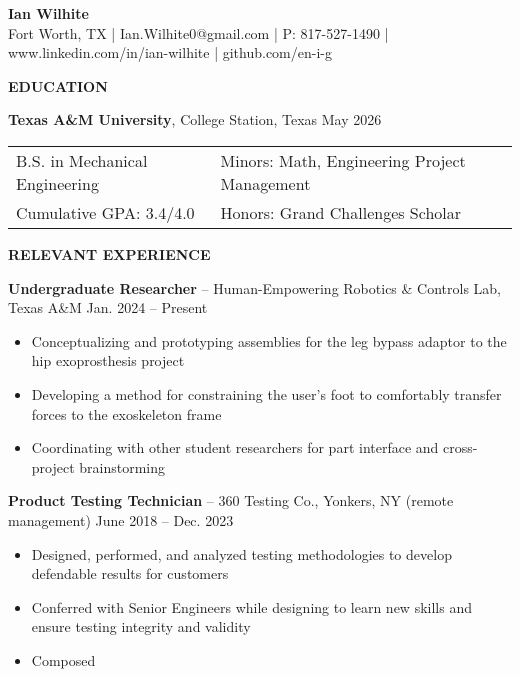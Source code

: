 \documentclass[18pt]{article}
\begin{document}
\begin{center}
    \LARGE \textbf{Ian Wilhite}\\ 
    \small Fort Worth, TX | Ian.Wilhite0@gmail.com | P: 817-527-1490 | www.linkedin.com/in/ian-wilhite | github.com/en-i-g
    
\end{center}

\begin{center}
    \textbf{EDUCATION}
    \hrulefill
\end{center}
\vspace{-0.5\baselineskip}
\textbf{Texas A\&M University}, College Station, Texas \hfill May 2026

\begin{tabular}{l|l} %
    B.S. in Mechanical Engineering \hspace*{1in} & Minors: Math, Engineering Project Management \\ 
    Cumulative GPA: 3.4/4.0 & Honors: Grand Challenges Scholar\\
\end{tabular}

\vspace{-0.5\baselineskip}
\begin{center}
    \textbf{RELEVANT EXPERIENCE}
    \hrulefill
\end{center}

\vspace{-0.5\baselineskip}
\textbf{Undergraduate Researcher} – Human-Empowering Robotics \& Controls Lab, Texas A\&M \hfill Jan. 2024 – Present

\begin{itemize}[noitemsep]
    \vspace{-0.75\baselineskip}
    \item Conceptualizing and prototyping assemblies for the leg bypass adaptor to the hip exoprosthesis project
    \item Developing a method for constraining the user’s foot to comfortably transfer forces to the exoskeleton frame
    \item Coordinating with other student researchers for part interface and cross-project brainstorming
\end{itemize}

\vspace{-0.5\baselineskip}
\textbf{Product Testing Technician} – 360 Testing Co., Yonkers, NY (remote management) \hfill June 2018 – Dec. 2023

\begin{itemize}[noitemsep]
    \vspace{-0.75\baselineskip}
    \item Designed, performed, and analyzed testing methodologies to develop defendable results for customers
    \item Conferred with Senior Engineers while designing to learn new skills and ensure testing integrity and validity
    \item Composed 
\end{itemize}
\end{document}
